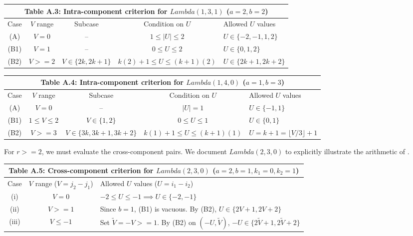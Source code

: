 \documentclass[11pt, a4paper]{article}
\theoremstyle{definition}
\def\Lambda{Lambda}%
\def\ge{>=}%
\begin{document}
\begin{table}[htbp]
\centering
\small
\renewcommand{\arraystretch}{1.2}
\begin{tabular}{|c|c|c|c|l|}
\hline
\multicolumn{5}{|c|}{\textbf{Table A.3:} Intra-component criterion for $\Lambda(1,3,1)$ ($a=2, b=2$)} \\
\hline
Case & $V$ range & Subcase & Condition on $U$ & Allowed $U$ values \\
\hline
(A) & $V = 0$ & -- & $1 \le |U| \le 2$ & $U \in \{-2, -1, 1, 2\}$ \\
(B1) & $V = 1$ & -- & $0 \le U \le 2$ & $U \in \{0, 1, 2\}$ \\
(B2) & $V \ge 2$ & $V \in \{2k, 2k+1\}$ & $k(2) + 1 \le U \le (k+1)(2)$ & $U \in \{2k+1, 2k+2\}$ \\
\hline
\end{tabular}
\end{table}

\begin{table}[htbp]
\centering
\small
\renewcommand{\arraystretch}{1.2}
\begin{tabular}{|c|c|c|c|l|}
\hline
\multicolumn{5}{|c|}{\textbf{Table A.4:} Intra-component criterion for $\Lambda(1,4,0)$ ($a=1, b=3$)} \\
\hline
Case & $V$ range & Subcase & Condition on $U$ & Allowed $U$ values \\
\hline
(A) & $V = 0$ & -- & $|U| = 1$ & $U \in \{-1, 1\}$ \\
(B1) & $1 \le V \le 2$ & $V \in \{1, 2\}$ & $0 \le U \le 1$ & $U \in \{0, 1\}$ \\
(B2) & $V \ge 3$ & $V \in \{3k, 3k+1, 3k+2\}$ & $k(1) + 1 \le U \le (k+1)(1)$ & $U = k+1 = \lfloor V/3 \rfloor + 1$ \\
\hline
\end{tabular}
\end{table}

For $r \ge 2$, we must evaluate the cross-component pairs. We document $\Lambda(2,3,0)$ to explicitly illustrate the arithmetic of .

\begin{table}[htbp]
\centering
\small
\renewcommand{\arraystretch}{1.2}
\begin{tabular}{|c|c|l|}
\hline
\multicolumn{3}{|c|}{\textbf{Table A.5:} Cross-component criterion for $\Lambda(2,3,0)$ ($a=2, b=1, k_1=0, k_2=1$)} \\
\hline
Case & $V$ range ($V=j_2-j_1$) & Allowed $U$ values ($U=i_1-i_2$) \\
\hline
(i) & $V = 0$ & $-2 \le U \le -1 \implies U \in \{-2, -1\}$ \\
(ii) & $V \ge 1$ & Since $b=1$, (B1) is vacuous. By (B2), $U \in \{2V+1, 2V+2\}$ \\
(iii) & $V \le -1$ & Set $\tilde{V}=-V \ge 1$. By (B2) on $(-U, \tilde{V})$, $-U \in \{2\tilde{V}+1, 2\tilde{V}+2\}$ \\
\hline
\end{tabular}
\end{table}
\end{document}
